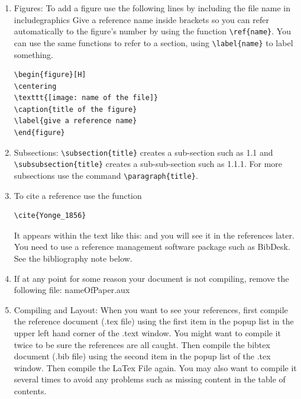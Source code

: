 \documentclass[ a4paper, 12pt, oneside ]{article} %
\begin{document}
{\begin{enumerate}
\item{ Figures:
To add a figure use the following lines by including the file name in includegraphics 
Give a reference name inside \label{} brackets so you can refer automatically to the figure's number by using the function \verb*|\ref{name}|. You can use the same functions to refer to a section, using \verb*|\label{name}| to label something.

\begin{verbatim}
\begin{figure}[H] 
\centering
\texttt{[image: name of the file]} 
\caption{title of the figure}
\label{give a reference name}
\end{figure}
\end{verbatim}
}

\item{Subsections: 
\verb*|\subsection{title}| creates a sub-section such as 1.1 and \verb*|\subsubsection{title}| creates a sub-sub-section such as 1.1.1. For more subsections use the command \verb*|\paragraph{title}|. }
\item{To cite a reference use the function \begin{verbatim}\cite{Yonge_1856}\end{verbatim} It appears within the text like this: \cite{Yonge_1856} and you will see it in the references later. You need to use a reference management software package such as BibDesk. See the bibliography note below.}

\item{If at any point for some reason your document is not compiling, remove the following file: nameOfPaper.aux}

\item{ Compiling and Layout: When you want to see your references, first compile the reference document (.tex file) using the first item in the popup list in the upper left hand corner of the .text window. You might want to compile it twice to be sure the references are all caught. Then compile the bibtex document (.bib file) using the second item in the popup list of the .tex window. Then compile the LaTex File again. You may also want to compile it several times to avoid any problems such as missing content in the table of contents.}


\end{enumerate}}
\end{document}
